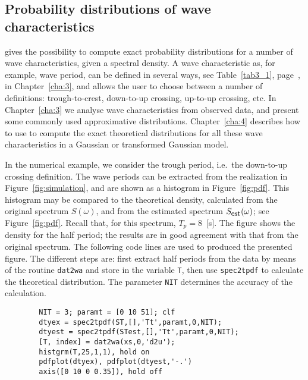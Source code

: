   \subsection{Probability distributions of wave characteristics} %
  \progname{} gives the possibility to compute exact probability
  distributions for a number of wave characteristics, given a spectral
  density. A wave characteristic as, for example, wave period, can be
  defined in several ways, see Table~\ref{tab3_1}, page~\pageref{tab3_1}, in
  Chapter~\ref{cha:3}, and \progname{} allows the user to choose between
  a number of definitions: trough-to-crest, down-to-up crossing,
  up-to-up crossing, etc. In Chapter~\ref{cha:3} we analyse wave
  characteristics from observed data, and present some commonly used
  approximative distributions. Chapter~\ref{cha:4} describes how to use
  \progname{} to compute the exact theoretical distributions for
  all these wave characteristics in a
  Gaussian or transformed Gaussian model.

  In the numerical example, we consider the trough
  period, i.e.\ the down-to-up crossing definition. The wave periods
  can be extracted from the realization in Figure~\ref{fig:simulation}, and
  are shown as a histogram in Figure~\ref{fig:pdf}. This histogram may be
  compared to the theoretical density, calculated from the original
  spectrum $S(\omega)$, and from
  the estimated spectrum $S_{\mbox{\footnotesize est}}(\omega)$; see
  Figure~\ref{fig:pdf}. Recall that, for this spectrum,  $T_p=8$~[s].
  The figure shows the density for the half period; the
  results are in good agreement with that from the original spectrum. The
  following code lines are used to produced the presented figure. The
  different steps are: first extract half periods from the data by
  means of the routine \verb+dat2wa+ 
  and store in the variable
  \verb+T+, then use \verb+spec2tpdf+ 
  to calculate the theoretical
  distribution.
The parameter \verb+NIT+ determines the accuracy of the calculation.
  {\small\begin{verbatim}
        NIT = 3; paramt = [0 10 51]; clf
        dtyex = spec2tpdf(ST,[],'Tt',paramt,0,NIT);
        dtyest = spec2tpdf(STest,[],'Tt',paramt,0,NIT);
        [T, index] = dat2wa(xs,0,'d2u');
        histgrm(T,25,1,1), hold on
        pdfplot(dtyex), pdfplot(dtyest,'-.')
        axis([0 10 0 0.35]), hold off
\end{verbatim}}

